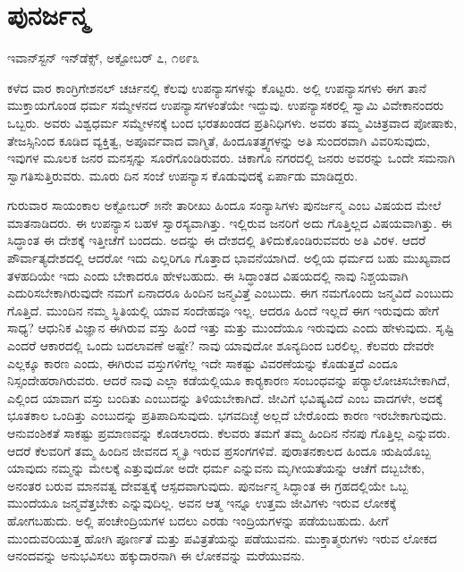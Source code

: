 \section*{ಪುನರ್ಜನ್ಮ }

\begin{flushright}
ಇವಾನ್‍ಸ್ಟನ್ ಇನ್‍ಡೆಕ್ಸ್, ಅಕ್ಟೋಬರ್ ೭, ೧೮೯೩
\end{flushright}

ಕಳೆದ ವಾರ ಕಾಂಗ್ರಿಗೇಶನಲ್ ಚರ್ಚಿನಲ್ಲಿ ಕೆಲವು ಉಪನ್ಯಾಸಗಳನ್ನು ಕೊಟ್ಟರು. ಅಲ್ಲಿ ಉಪನ್ಯಾಸಗಳು ಈಗ ತಾನೆ ಮುಕ್ತಾಯಗೊಂಡ ಧರ್ಮ ಸಮ್ಮೇಳನದ ಉಪನ್ಯಾಸಗಳಂತೆಯೇ ಇದ್ದುವು. ಉಪನ್ಯಾಸಕರಲ್ಲಿ ಸ್ವಾಮಿ ವಿವೇಕಾನಂದರು ಒಬ್ಬರು. ಅವರು ವಿಶ್ವಧರ್ಮ ಸಮ್ಮೇಳನಕ್ಕೆ ಬಂದ ಭರತಖಂಡದ ಪ್ರತಿನಿಧಿಗಳು. ಅವರು ತಮ್ಮ ವಿಚಿತ್ರವಾದ ಪೋಷಾಕು, ತೇಜಸ್ಸಿನಿಂದ ಕೂಡಿದ ವ್ಯಕ್ತಿತ್ವ, ಅಪೂರ್ವವಾದ ವಾಗ್ಮಿತೆ, ಹಿಂದೂತತ್ತ್ವಗಳನ್ನು ಅತಿ ಸುಂದರವಾಗಿ ವಿವರಿಸುವುದು, ಇವುಗಳ ಮೂಲಕ ಜನರ ಮನಸ್ಸನ್ನು ಸೂರೆಗೊಂಡಿರುವರು. ಚಿಕಾಗೊ ನಗರದಲ್ಲಿ ಜನರು ಅವರನ್ನು ಒಂದೇ ಸಮನಾಗಿ ಸ್ವಾಗತಿಸುತ್ತಿರುವರು. ಮೂರು ದಿನ ಸಂಜೆ ಉಪನ್ಯಾಸ ಕೊಡುವುದಕ್ಕೆ ಏರ್ಪಾಡು ಮಾಡಿದ್ದರು. 

 ಗುರುವಾರ ಸಾಯಂಕಾಲ ಅಕ್ಟೋಬರ್ ೫ನೇ ತಾರೀಖು ಹಿಂದೂ ಸಂನ್ಯಾಸಿಗಳು ಪುನರ್ಜನ್ಮ ಎಂಬ ವಿಷಯದ ಮೇಲೆ ಮಾತನಾಡಿದರು. ಈ ಉಪನ್ಯಾಸ ಬಹಳ ಸ್ವಾರಸ್ಯವಾಗಿತ್ತು. ಇಲ್ಲಿರುವ ಜನರಿಗೆ ಅದು ಗೊತ್ತಿಲ್ಲದ ವಿಷಯವಾಗಿತ್ತು. ಈ ಸಿದ್ಧಾಂತ ಈ ದೇಶಕ್ಕೆ ಇತ್ತೀಚೆಗೆ ಬಂದದು. ಅದನ್ನು ಈ ದೇಶದಲ್ಲಿ ತಿಳಿದುಕೊಂಡಿರುವವರು ಅತಿ ವಿರಳ. ಆದರೆ ಪೌರ್ವಾತ್ಯದೇಶದಲ್ಲಿ ಆದರೋ ಇದು ಎಲ್ಲರಿಗೂ ಗೊತ್ತಾದ ಭಾವನೆಯಾಗಿದೆ. ಅಲ್ಲಿಯ ಧರ್ಮದ ಬಹು ಮುಖ್ಯವಾದ ತಳಹದಿಯೇ ಇದು ಎಂದು ಬೇಕಾದರೂ ಹೇಳಬಹುದು. ಈ ಸಿದ್ಧಾಂತದ ವಿಷಯದಲ್ಲಿ ನಾವು ನಿಶ್ಚಯವಾಗಿ ಎದುರಿಸಬೇಕಾಗಿರುವುದೇ ನಮಗೆ ಏನಾದರೂ ಹಿಂದಿನ ಜನ್ಮವಿತ್ತೆ ಎಂಬುದು. ಈಗ ನಮಗೊಂದು ಜನ್ಮವಿದೆ ಎಂಬುದು ಗೊತ್ತಿದೆ. ಮುಂದಿನ ನಮ್ಮ ಸ್ಥಿತಿಯಲ್ಲಿ ಯಾವ ಸಂದೇಹವೂ ಇಲ್ಲ. ಆದರೂ ಹಿಂದೆ ಇಲ್ಲದೆ ಈಗ ಇರುವುದು ಹೇಗೆ ಸಾಧ್ಯ? ಆಧುನಿಕ ವಿಜ್ಞಾನ ಈಗಿರುವ ವಸ್ತು ಹಿಂದೆ ಇತ್ತು ಮತ್ತು ಮುಂದೆಯೂ ಇರುವುದು ಎಂದು ಹೇಳುವುದು. ಸೃಷ್ಟಿ ಎಂದರೆ ಆಕಾರದಲ್ಲಿ ಒಂದು ಬದಲಾವಣೆ ಅಷ್ಟೇ? ನಾವು ಯಾವುದೋ ಶೂನ್ಯದಿಂದ ಬರಲಿಲ್ಲ. ಕೆಲವರು ದೇವರೇ ಎಲ್ಲಕ್ಕೂ ಕಾರಣ ಎಂದು, ಈಗಿರುವ ವಸ್ತುಗಳಿಗೆಲ್ಲ ಇದೇ ಸಾಕಷ್ಟು ವಿವರಣೆಯನ್ನು ಕೊಡುತ್ತದೆ ಎಂದೂ ನಿಸ್ಸಂದೇಹರಾಗಿರುವರು. ಆದರೆ ನಾವು ಎಲ್ಲಾ ಕಡೆಯಲ್ಲಿಯೂ ಕಾರ‍್ಯಕಾರಣ ಸಂಬಂಧವನ್ನು ಪರ‍್ಯಾಲೋಚಿಸಬೇಕಾಗಿದೆ, ಎಲ್ಲಿಂದ ಯಾವಾಗ ವಸ್ತು ಬಂದಿತು ಎಂಬುದನ್ನು ತಿಳಿಯಬೇಕಾಗಿದೆ. ಜೀವಿಗೆ ಭವಿಷ್ಯವಿದೆ ಎಂಬ ವಾದಗಳೇ, ಅದಕ್ಕೆ ಭೂತಕಾಲ ಒಂದಿತ್ತು ಎಂಬುದನ್ನು ಪ್ರತಿಪಾದಿಸುವುದು. ಭಗವದಿಚ್ಛೆ ಅಲ್ಲದೆ ಬೇರೊಂದು ಕಾರಣ ಇರಬೇಕಾಗುವುದು. ಆನುವಂಶಿಕತೆ ಸಾಕಷ್ಟು ಪ್ರಮಾಣವನ್ನು ಕೊಡಲಾರದು. ಕೆಲವರು ತಮಗೆ ತಮ್ಮ ಹಿಂದಿನ ನೆನಪು ಗೊತ್ತಿಲ್ಲ ಎನ್ನುವರು. ಆದರೆ ಕೆಲವರಿಗೆ ತಮ್ಮ ಹಿಂದಿನ ಜೀವನದ ಸ್ಮೃತಿ ಇರುವ ಪ್ರಸಂಗಗಳಿವೆ. ಪುರಾತನಕಾಲದ ಹಿಂದೂ ಋಷಿಯೊಬ್ಬ ಯಾವುದು ನಮ್ಮನ್ನು ಮೇಲಕ್ಕೆ ಎತ್ತುವುದೋ ಅದೇ ಧರ್ಮ ಎನ್ನುವನು ಮೃಗೀಯತೆಯನ್ನು ಆಚೆಗೆ ದಬ್ಬಬೇಕು, ಅನಂತರ ಬರುವ ಮಾನವತ್ವ ದೇವತ್ವಕ್ಕೆ ಆಸ್ಪದವಾಗುವುದು. ಪುನರ್ಜನ್ಮ ಸಿದ್ಧಾಂತ ಈ ಗ್ರಹದಲ್ಲಿಯೇ ಒಬ್ಬ ಮುಂದೆಯೂ ಜನ್ಮವೆತ್ತಬೇಕು ಎನ್ನುವುದಿಲ್ಲ. ಅವನ ಆತ್ಮ ಇನ್ನೂ ಉತ್ತಮ ಜೀವಿಗಳು ಇರುವ ಲೋಕಕ್ಕೆ ಹೋಗಬಹುದು. ಅಲ್ಲಿ ಪಂಚೇಂದ್ರಿಯಗಳ ಬದಲು ಎರಡು ಇಂದ್ರಿಯಗಳನ್ನು ಪಡೆಯಬಹುದು. ಹೀಗೆ ಮುಂದುವರಿಯುತ್ತ ಹೋಗಿ ಪೂರ್ಣತೆ ಮತ್ತು ಪವಿತ್ರತೆಯನ್ನು ಪಡೆಯುವನು. ಮುಕ್ತಾತ್ಮರುಗಳು ಇರುವ ಲೋಕದ ಆನಂದವನ್ನು ಅನುಭವಿಸಲು ಹಕ್ಕುದಾರನಾಗಿ ಈ ಲೋಕವನ್ನು ಮರೆಯುವನು.


